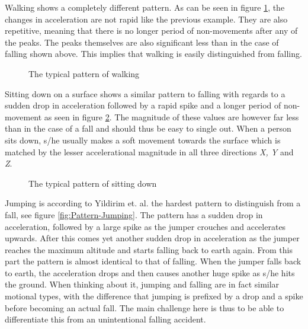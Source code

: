 \documentclass[12pt, a4paper, onecolumn]{article}
\begin{document}
	
	\noindent Walking shows a completely different pattern. As can be seen in figure \ref{fig:Pattern-Walking}, the changes in acceleration are not rapid like the previous example. They are also repetitive, meaning that there is no longer period of non-movements after any of the peaks. The peaks themselves are also significant less than in the case of falling shown above. This implies that walking is easily distinguished from falling.
	
	
	\begin{figure}[H]
		\centering
		\caption{The typical pattern of walking}%
		\label{fig:Pattern-Walking}%
	\end{figure}
	
	
	\noindent Sitting down on a surface shows a similar pattern to falling with regards to a sudden drop in acceleration followed by a rapid spike and a longer period of non-movement as seen in figure \ref{fig:Pattern-Sittin}. The magnitude of these values are however far less than in the case of a fall and should thus be easy to single out. When a person sits down, s/he usually makes a soft movement towards the surface which is matched by the lesser accelerational  magnitude in all three directions \textit{X, Y} and \textit{Z}.
	
	\begin{figure}[H]
		\centering
		\caption{The typical pattern of sitting down}%
		\label{fig:Pattern-Sittin}%
	\end{figure}
	
	
	\noindent Jumping is according to Yildirim et. al. the hardest pattern to distinguish from a fall, see figure \ref{fig:Pattern-Jumping}. The pattern has a sudden drop in acceleration, followed by a large spike as the jumper crouches and accelerates upwards. After this comes yet another sudden drop in acceleration as the jumper reaches the maximum altitude and starts falling back to earth again. From this part the pattern is almost identical to that of falling. When the jumper falls back to earth, the acceleration drops and then causes another huge spike as s/he hits the ground. When thinking about it, jumping and falling are in fact similar motional types, with the difference that jumping is prefixed by a drop and a spike before becoming an actual fall. The main challenge here is thus to be able to differentiate this from an unintentional falling accident.
	
\end{document}
